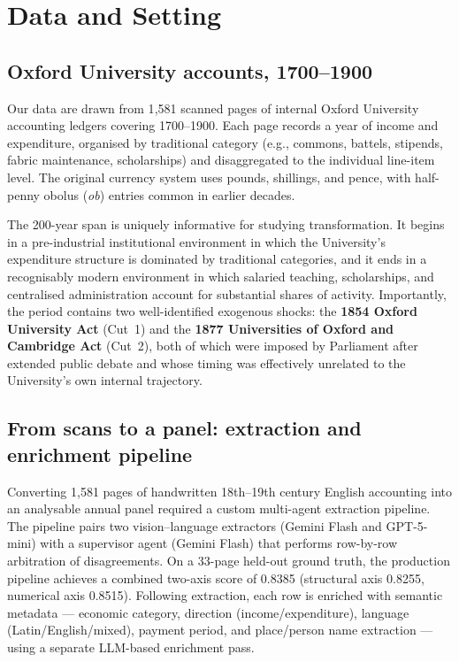 \documentclass[11pt]{article}
\begin{document}
\section{Data and Setting}
\label{sec:data}

\subsection{Oxford University accounts, 1700--1900}

Our data are drawn from 1{,}581 scanned pages of internal Oxford University accounting ledgers covering 1700--1900. Each page records a year of income and expenditure, organised by traditional category (e.g., commons, battels, stipends, fabric maintenance, scholarships) and disaggregated to the individual line-item level. The original currency system uses pounds, shillings, and pence, with half-penny obolus (\emph{ob}) entries common in earlier decades.

The 200-year span is uniquely informative for studying transformation. It begins in a pre-industrial institutional environment in which the University's expenditure structure is dominated by traditional categories, and it ends in a recognisably modern environment in which salaried teaching, scholarships, and centralised administration account for substantial shares of activity. Importantly, the period contains two well-identified exogenous shocks: the \textbf{1854 Oxford University Act} (Cut~1) and the \textbf{1877 Universities of Oxford and Cambridge Act} (Cut~2), both of which were imposed by Parliament after extended public debate and whose timing was effectively unrelated to the University's own internal trajectory.

\subsection{From scans to a panel: extraction and enrichment pipeline}

Converting 1{,}581 pages of handwritten 18th--19th century English accounting into an analysable annual panel required a custom multi-agent extraction pipeline. The pipeline pairs two vision--language extractors (Gemini Flash and GPT-5-mini) with a supervisor agent (Gemini Flash) that performs row-by-row arbitration of disagreements. On a 33-page held-out ground truth, the production pipeline achieves a combined two-axis score of 0.8385 (structural axis 0.8255, numerical axis 0.8515). Following extraction, each row is enriched with semantic metadata --- economic category, direction (income/expenditure), language (Latin/English/mixed), payment period, and place/person name extraction --- using a separate LLM-based enrichment pass.
\end{document}
